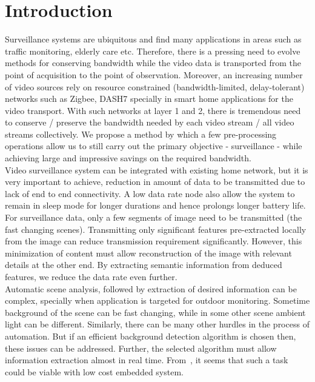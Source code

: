 \documentclass[conference]{IEEEtran}
\begin{document}
\section{Introduction}
\indent Surveillance systems are ubiquitous and find many applications
in areas such as traffic monitoring, elderly care etc. Therefore, there
is a pressing need to evolve methods for conserving bandwidth while the
video data is transported from the point of acquisition to the point of
observation. Moreover, an increasing number of video sources rely on
resource constrained (bandwidth-limited, delay-tolerant) networks
such as Zigbee, DASH7 specially in smart home applications for the video
transport. With such networks at layer 1 and 2, there is tremendous
need to conserve / preserve the bandwidth needed by each video stream /
all video streams collectively. We propose a method by which a few
pre-processing operations allow us to still carry out the primary
objective - surveillance - while achieving large and impressive savings
on the required bandwidth.\\
\indent Video surveillance system can be integrated with existing home
network, but it is very important to achieve, reduction in amount
of data to be transmitted due to lack of end to end connectivity. A low
data rate node also allow the system to remain in sleep mode for
longer durations and hence prolongs longer battery life.\\
\indent For surveillance data, only a few segments of image need to be
transmitted (the fast changing scenes). Transmitting only significant
features pre-extracted locally from the image can reduce transmission
requirement significantly. However, this minimization of content must
allow reconstruction of the image with relevant details at the other
end. By extracting semantic information from deduced features, we
reduce the data rate even further.\\
\indent Automatic scene analysis, followed by extraction of  desired
information can be complex, specially when application is targeted for
outdoor monitoring. Sometime background of the scene can be fast
changing, while in some other scene ambient light can be different.
Similarly, there can be many other hurdles in the process of automation.
But if an efficient background detection algorithm is chosen then, these
issues can be addressed. Further, the selected algorithm must allow
information extraction almost in real time. From~\cite{3, 5},
it seems that such a task could be
viable with low cost embedded system.\\
\end{document}
